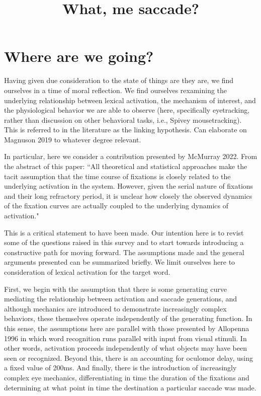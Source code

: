 \documentclass{article}
\title{What, me saccade?}
\date{}
\begin{document}



%


\section{Where are we going?} 

Having given due consideration to the state of things are they are, we find ourselves in a time of moral reflection. We find ourselves rexamining the underlying relationship between lexical activation, the mechanism of interest, and the physiological behavior we are able to observe (here, specifically eyetracking, rather than discussion on other behavioral tasks, i.e., Spivey mousetracking). This is referred to in the literature as the linking hypothesis. Can elaborate on Magnuson 2019 to whatever degree relevant. 

In particular, here we consider a contribution presented by McMurray 2022. From the abstract of this paper: ``All theoretical and statistical approaches make the tacit assumption that the time course of fixations is closely related to the underlying activation in the system. However, given the serial nature of fixations and their long refractory period, it is unclear how closely the observed dynamics of the fixation curves are actually coupled to the underlying dynamics of activation."

This is a critical statement to have been made. Our intention here is to revist some of the questions raised in this survey and to start towards introducing a constructive path for moving forward. The assumptions made and the general arguments presented can be summarized briefly. We limit ourselves here to consideration of lexical activation for the target word.

First, we begin with the assumption that there is some generating curve mediating the relationship between activation and saccade generations, and although mechanics are introduced to demonstrate increasingly complex behaviors, these themselves operate independently of the generating function. In this sense, the assumptions here are  parallel with those presented by Allopenna 1996 in which word recognition runs parallel with input from visual stimuli. In other words, activation proceeds independently of what objects may have been seen or recognized. Beyond this, there is an accounting for oculomor delay, using a fixed value of 200ms. And finally, there is the introduction of increasingly complex eye mechanics, differentiating in time the duration of the fixations and determining at what point in time the destination a particular saccade was made.
\end{document}
